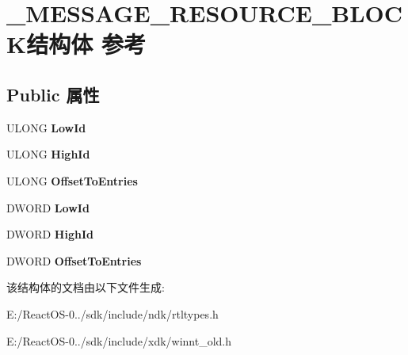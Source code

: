 \hypertarget{struct___m_e_s_s_a_g_e___r_e_s_o_u_r_c_e___b_l_o_c_k}{}\section{\+\_\+\+M\+E\+S\+S\+A\+G\+E\+\_\+\+R\+E\+S\+O\+U\+R\+C\+E\+\_\+\+B\+L\+O\+C\+K结构体 参考}
\label{struct___m_e_s_s_a_g_e___r_e_s_o_u_r_c_e___b_l_o_c_k}
\subsection*{Public 属性}
\begin{DoxyCompactItemize}
\item 
\mbox{\label{struct___m_e_s_s_a_g_e___r_e_s_o_u_r_c_e___b_l_o_c_k_ad841f515393bf6e56759f893b1617481}} 
U\+L\+O\+NG {\bfseries Low\+Id}
\item 
\mbox{\label{struct___m_e_s_s_a_g_e___r_e_s_o_u_r_c_e___b_l_o_c_k_a8692546e2e48a2acffe33d621f50b43d}} 
U\+L\+O\+NG {\bfseries High\+Id}
\item 
\mbox{\label{struct___m_e_s_s_a_g_e___r_e_s_o_u_r_c_e___b_l_o_c_k_a002e98b9739c163cd623578c02bad938}} 
U\+L\+O\+NG {\bfseries Offset\+To\+Entries}
\item 
\mbox{\label{struct___m_e_s_s_a_g_e___r_e_s_o_u_r_c_e___b_l_o_c_k_a067d97e64ea3fb1e76dbce0ca6d0ba2a}} 
D\+W\+O\+RD {\bfseries Low\+Id}
\item 
\mbox{\label{struct___m_e_s_s_a_g_e___r_e_s_o_u_r_c_e___b_l_o_c_k_a2d472355f1817bc726d7535ea02ec91a}} 
D\+W\+O\+RD {\bfseries High\+Id}
\item 
\mbox{\label{struct___m_e_s_s_a_g_e___r_e_s_o_u_r_c_e___b_l_o_c_k_a7691c81ea3a8c0e40c979dcf1dd89f7c}} 
D\+W\+O\+RD {\bfseries Offset\+To\+Entries}
\end{DoxyCompactItemize}


该结构体的文档由以下文件生成\+:\begin{DoxyCompactItemize}
\item 
E\+:/\+React\+O\+S-\/0../sdk/include/ndk/rtltypes.\+h\item 
E\+:/\+React\+O\+S-\/0../sdk/include/xdk/winnt\+\_\+old.\+h\end{DoxyCompactItemize}
